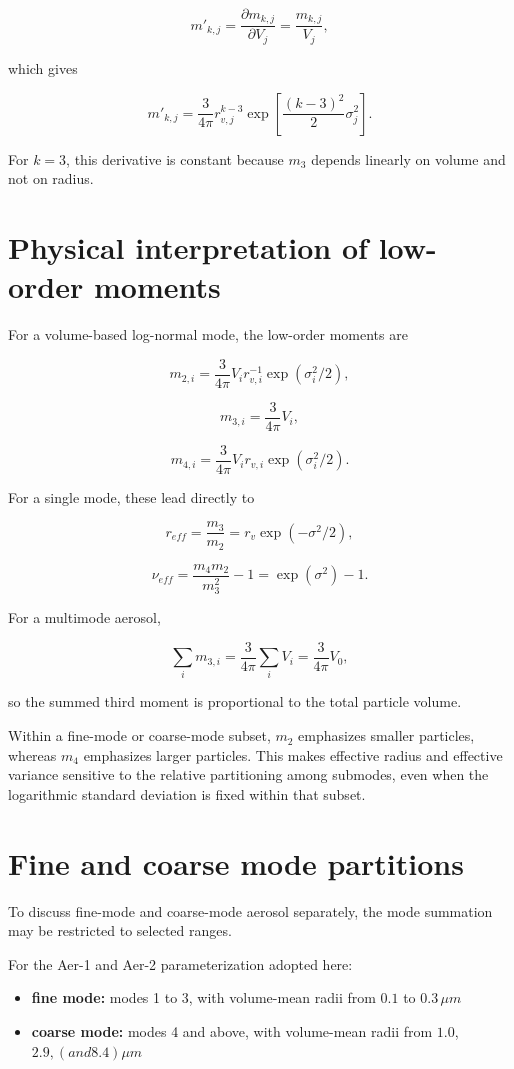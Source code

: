 \documentclass[
  letterpaper,
  open=any]{scrbook}
\providecommand{\tightlist}{%
  \setlength{\itemsep}{0pt}\setlength{\parskip}{0pt}}
\begin{document}
\[
m'_{k,j}=\frac{\partial m_{k,j}}{\partial V_j}=\frac{m_{k,j}}{V_j},
\]

which gives

\[
m'_{k,j}=\frac{3}{4 \pi}
r^{k-3}_{v,j} \exp\left[\frac{(k-3)^2}{2} \sigma_j^2\right].
\]

For \(k=3\), this derivative is constant because \(m_3\) depends
linearly on volume and not on radius.

\section{Physical interpretation of low-order
moments}\label{physical-interpretation-of-low-order-moments}

For a volume-based log-normal mode, the low-order moments are

\[
m_{2,i}=\frac{3}{4\pi} V_i r_{v,i}^{-1} \exp(\sigma_i^2/2),
\]

\[
m_{3,i}=\frac{3}{4\pi} V_i,
\]

\[
m_{4,i}=\frac{3}{4\pi} V_i r_{v,i} \exp(\sigma_i^2/2).
\]

For a single mode, these lead directly to

\[
r_{eff}=\frac{m_3}{m_2}=r_v \exp(-\sigma^2/2),
\]

\[
\nu_{eff}=\frac{m_4 m_2}{m_3^2}-1=\exp (\sigma^2)-1.
\]

For a multimode aerosol,

\[
\sum_i m_{3,i}=\frac{3}{4\pi}\sum_i V_i=\frac{3}{4\pi} V_0,
\]

so the summed third moment is proportional to the total particle volume.

Within a fine-mode or coarse-mode subset, \(m_2\) emphasizes smaller
particles, whereas \(m_4\) emphasizes larger particles. This makes
effective radius and effective variance sensitive to the relative
partitioning among submodes, even when the logarithmic standard
deviation is fixed within that subset.

\section{Fine and coarse mode
partitions}\label{fine-and-coarse-mode-partitions}

To discuss fine-mode and coarse-mode aerosol separately, the mode
summation may be restricted to selected ranges.

For the Aer-1 and Aer-2 parameterization adopted here:

\begin{itemize}
\tightlist
\item
  \textbf{fine mode:} modes 1 to 3, with volume-mean radii from \(0.1\)
  to \(0.3 \, \mu m\)
\item
  \textbf{coarse mode:} modes 4 and above, with volume-mean radii from
  \(1.0\), \(2.9, (and 8.4) \mu m\)
\end{itemize}
\end{document}
